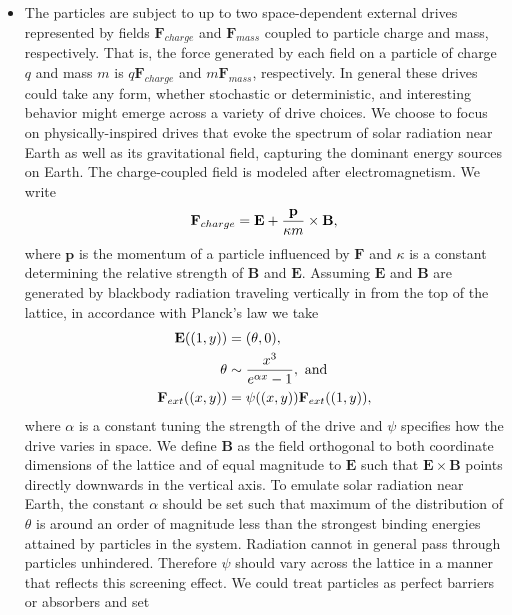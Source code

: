 \documentclass[12pt,letterpaper]{article}
\newcommand{\mb}{\mathbf}
\begin{document}
\begin{itemize}
\begin{align*}
U(\mb{r} + \mb{e}; a) - U(\mb{r}; a) = \nabla_{\mb{e}} U(\mb{r}; a) \cdot \mb{e}.
\end{align*}
This mirrors one standard definition of the gradient via the total derivative. For unit shift vectors $\mb{e}$, we have
\begin{align*}
\nabla_{\mb{e}} U(\mb{r}; a) = (U(\mb{r} + \mb{e}; a) - U(\mb{r}; a))\mb{e}.
\end{align*}
\item The particles are subject to up to two space-dependent external drives represented by fields $\mb{F}_{charge}$ and $\mb{F}_{mass}$ coupled to particle charge and mass, respectively. That is, the force generated by each field on a particle of charge $q$ and mass $m$ is $q\mb{F}_{charge}$ and $m\mb{F}_{mass}$, respectively. In general these drives could take any form, whether stochastic or deterministic, and interesting behavior might emerge across a variety of drive choices. We choose to focus on physically-inspired drives that evoke the spectrum of solar radiation near Earth as well as its gravitational field, capturing the dominant energy sources on Earth. The charge-coupled field is modeled after electromagnetism. We write
\begin{align*}
\mb{F}_{charge} = \mb{E} + {\mb{p} \over \kappa m} \times \mb{B},
\end{align*}
where $\mb{p}$ is the momentum of a particle influenced by $\mb{F}$ and $\kappa$ is a constant determining the relative strength of $\mb{B}$ and $\mb{E}$. Assuming $\mb{E}$ and $\mb{B}$ are generated by blackbody radiation traveling vertically in from the top of the lattice, in accordance with Planck's law we take
\begin{align*}
\mb{E}((1, y)) &= (\theta, 0), \\
\theta &\sim {x^{3} \over e^{\alpha x} - 1}, \textrm{ and} \\
\mb{F}_{ext}((x, y)) &= \psi((x, y))\mb{F}_{ext}((1, y)),
\end{align*}
where $\alpha$ is a constant tuning the strength of the drive and $\psi$ specifies how the drive varies in space. We define $\mb{B}$ as the field orthogonal to both coordinate dimensions of the lattice and of equal magnitude to $\mb{E}$ such that $\mb{E} \times \mb{B}$ points directly downwards in the vertical axis. To emulate solar radiation near Earth, the constant $\alpha$ should be set such that maximum of the distribution of $\theta$ is around an order of magnitude less than the strongest binding energies attained by particles in the system. Radiation cannot in general pass through particles unhindered. Therefore $\psi$ should vary across the lattice in a manner that reflects this screening effect. We could treat particles as perfect barriers or absorbers and set

\end{itemize}
\end{document}
